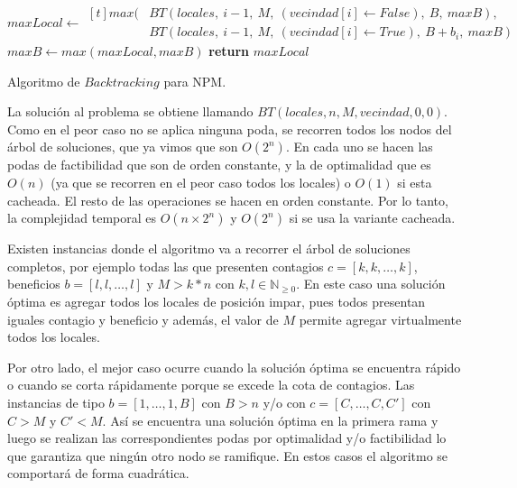 \begin{algorithm}
    \begin{algorithmic}[1]
            \EndIf
            \EndIf
            \EndIf
            \label{alg:bt-max-restante}
            \EndIf
            \State $maxLocal \gets \begin{aligned}[t] %
                 max(&BT(locales,\ i-1,\ M,\ (vecindad[i] \gets False),\ B,\ maxB),\\
                     &BT(locales,\ i-1,\ M,\ (vecindad[i] \gets True),\ B + b_i,\ maxB)&
            \end{aligned}$
            \State $maxB \gets max(maxLocal, maxB)$
            \State \textbf{return} $maxLocal$
        \EndFunction
    \end{algorithmic}
    \caption{Algoritmo de $Backtracking$ para NPM.}
    \label{alg:bactkracking}
\end{algorithm}

La solución al problema se obtiene llamando $BT(locales, n, M, vecindad, 0, 0)$. Como en el peor caso no se aplica ninguna poda, se recorren todos los nodos del árbol de soluciones, que ya vimos que son $O(2^n)$. En cada uno se hacen las podas de factibilidad que son de orden constante, y la de optimalidad que es $O(n)$ (ya que se recorren en el peor caso todos los locales) o $O(1)$ si esta cacheada. El resto de las operaciones se hacen en orden constante. Por lo tanto, la complejidad temporal es $O(n \times 2^n)$ y $O(2^n)$ si se usa la variante cacheada.

Existen instancias donde el algoritmo va a recorrer el árbol de soluciones completos, por ejemplo todas las que presenten contagios $c=[k,k,\dots,k]$, beneficios $b=[l,l,\dots,l]$ y $M>k*n$ con $k,l \in \mathbb{N}_{\ge 0}$. En este caso una solución óptima es agregar todos los locales de posición impar, pues todos presentan iguales contagio y beneficio y además, el valor de $M$ permite agregar virtualmente todos los locales.

Por otro lado, el mejor caso ocurre cuando la solución óptima se encuentra rápido o cuando se corta rápidamente porque se excede la cota de contagios. Las instancias de tipo $b=[1,\dots,1,B]$ con $B>n$ y/o con $c=[C,\dots,C,C']$ con $C>M$ y $C'<M$. Así se encuentra una solución óptima en la primera rama y luego se realizan las correspondientes podas por optimalidad y/o factibilidad lo que garantiza que ningún otro nodo se ramifique. En estos casos el algoritmo se comportará de forma cuadrática.

